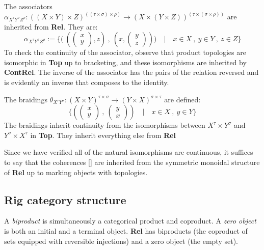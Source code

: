 The associators $\alpha_{X^{\tau}Y^{\sigma}Z^{\rho}} : ((X \times Y) \times Z)^{((\tau \times \sigma) \times \rho)} \rightarrow (X \times (Y \times Z))^{(\tau \times (\sigma \times \rho))}$ are inherited from \textbf{Rel}. They are:
\[\alpha_{X^{\tau}Y^{\sigma}Z^{\rho}} := \{\big( \ (\begin{pmatrix} x \\ y \end{pmatrix} , z) \ , \ (x, \begin{pmatrix} y \\ z \end{pmatrix}) \big) \quad | \quad x \in X \ , \ y \in Y \ ,\ z \in Z \}\]
To check the continuity of the associator, observe that product topologies are isomorphic in \textbf{Top} up to bracketing, and these isomorphisms are inherited by \textbf{ContRel}. The inverse of the associator has the pairs of the relation reversed and is evidently an inverse that composes to the identity.

The braidings $\theta_{X^{\tau}Y^{\sigma}} : (X \times Y)^{\tau \times \sigma} \rightarrow (Y \times X)^{\sigma \times \tau}$ are defined:
\[\{(\begin{pmatrix} x \\ y \end{pmatrix} \ , \ \begin{pmatrix} y \\ x \end{pmatrix}) \quad | \quad x \in X \ , \ y \in Y  \}\]
The braidings inherit continuity from the isomorphisms between $X^\tau \times Y^\sigma$ and $Y^\sigma \times X^\tau$ in \textbf{Top}. They inherit everything else from \textbf{Rel}

Since we have verified all of the natural isomorphisms are continuous, it suffices to say that the coherences [] are inherited from the symmetric monoidal structure of \textbf{Rel} up to marking objects with topologies.

\subsection{Rig category structure}

\begin{defn}
A \emph{biproduct} is simultaneously a categorical product and coproduct. A \emph{zero object} is both an initial and a terminal object. \textbf{Rel} has biproducts (the coproduct of sets equipped with reversible injections) and a zero object (the empty set).
\end{defn}

